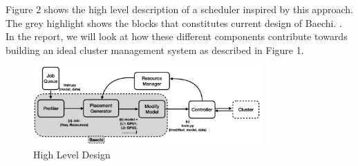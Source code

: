 Figure 2 shows the high level description of a scheduler inspired by this
approach. The grey highlight shows the blocks that constitutes current design of
Baechi. \cite{baechi}. In the report, we will look at how these different
components contribute towards building an ideal cluster management system as
described in Figure 1.

\begin{figure}[htbp]
\centerline{\includegraphics[height=3cm]{figures/baechi.jpg}}
\caption{High Level Design}
\label{fig3}
\end{figure}


